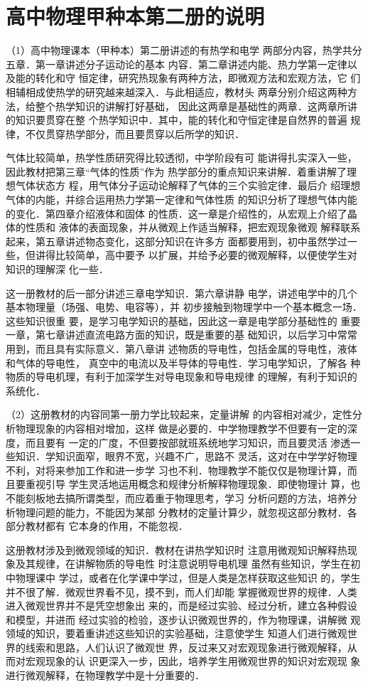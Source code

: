\chapter{高中物理甲种本第二册的说明}

（1）高中物理课本（甲种本）第二册讲述的有热学和电学
两部分内容，热学共分五章．第一章讲述分子运动论的基本
内容．第二章讲述内能、热力学第一定律以及能的转化和守
恒定律，研究热现象有两种方法，即微观方法和宏观方法，它
们相辅相成使热学的研究越来越深入．与此相适应，教材头
两章分别介绍这两种方法，给整个热学知识的讲解打好基础，
因此这两章是基础性的两章．这两章所讲的知识要贯穿在整
个热学知识中．其中，能的转化和守恒定律是自然界的普遍
规律，不仅贯穿热学部分，而且要贯穿以后所学的知识．

气体比较简单，热学性质研究得比较透彻，中学阶段有可
能讲得扎实深入一些，因此教材把第三章“气体的性质”作为
热学部分的重点知识来讲解．着重讲解了理想气体状态方
程，用气体分子运动论解释了气体的三个实验定律．最后介
绍理想气体的内能，并综合运用热力学第一定律和气体性质
的知识分析了理想气体内能的变化．第四章介绍液体和固体
的性质．这一章是介绍性的，从宏观上介绍了晶体的性质和
液体的表面现象，并从微观上作适当解释，把宏观现象微观
解释联系起来，第五章讲述物态变化，这部分知识在许多方
面都要用到，初中虽然学过一些，但讲得比较简单，高中要予
以扩展，并给予必要的微观解释，以便使学生对知识的理解深
化一些．

这一册教材的后一部分讲述三章电学知识．第六章讲静
电学，讲述电学中的几个基本物理量（场强、电势、电容等），并
初步接触到物理学中一个基本概念一场．这些知识很重
要，是学习电学知识的基础，因此这一章是电学部分基础性的
重要一章，第七章讲述直流电路方面的知识，既是重要的基
础知识，以后学习中常常用到，而且具有实际意义．第八章讲
述物质的导电性，包括金属的导电性，液体和气体的导电性，
真空中的电流以及半导体的导电性．学习电学知识，了解各
种物质的导电机理，有利于加深学生对导电现象和导电规律
的理解，有利于知识的系统化．

（2）这册教材的内容同第一册力学比较起来，定量讲解
的内容相对减少，定性分析物理现象的内容相对增加，这样
做是必要的．中学物理教学不但要有一定的深度，而且要有
一定的广度，不但要按部就班系统地学习知识，而且要灵活
渗透一些知识．学知识面窄，眼界不宽，兴趣不广，思路不
灵活，这对在中学学好物理不利，对将来参加工作和进一步学
习也不利．物理教学不能仅仅是物理计算，而且要重视引导
学生灵活地运用概念和规律分析解释物理现象．即使物理计
算，也不能刻板地去搞所谓类型，而应着重于物理思考，学习
分析问题的方法，培养分析物理问题的能力，不能因为某部
分教材的定量计算少，就忽视这部分教材．各部分教材都有
它本身的作用，不能忽视．

这册教材涉及到微观领域的知识．教材在讲热学知识时
注意用微观知识解释热现象及其规律，在讲解物质的导电性
时注意说明导电机理 虽然有些知识，学生在初中物理课中
学过，或者在化学课中学过，但是人类是怎样获取这些知识
的，学生并不很了解．微观世界看不见，摸不到，而人们却能
掌握微观世界的规律．人类进入微观世界并不是凭空想象出
来的，而是经过实验、经过分析，建立各种假设和模型，并进而
经过实验的检验，逐步认识微观世界的，作为物理课，讲解微
观领域的知识，要着重讲述这些知识的实验基础，注意使学生
知道人们进行微观世界的线索和思路，人们认识了微观世
界，反过来又对宏观现象进行微观解释，从而对宏观现象的认
识更深入一步，因此，培养学生用微观世界的知识对宏观现
象进行微观解释，在物理教学中是十分重要的．

